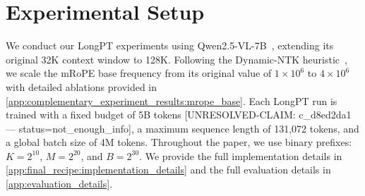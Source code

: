 \section{Experimental Setup}
\label{sec:setup}
We conduct our LongPT experiments using Qwen2.5-VL-7B~\citep{bai2025qwen2}, extending its original 32K context window to 128K.
Following the Dynamic-NTK heuristic~\citep{dynamicntk}, we scale the mRoPE base frequency from its original value of $1\times10^6$ to $4\times10^6$ with detailed ablations provided in \cref{app:complementary_experiment_results:mrope_base}.
Each LongPT run is trained with a fixed budget of 5B tokens [UNRESOLVED-CLAIM: c_d8ed2da1 — status=not_enough_info], a maximum sequence length of 131,072 tokens, and a global batch size of 4M tokens.
Throughout the paper, we use binary prefixes: $K=2^{10}$, $M=2^{20}$, and $B=2^{30}$.
We provide the full implementation details in \cref{app:final_recipe:implementation_details} and the full evaluation details in \cref{app:evaluation_details}.